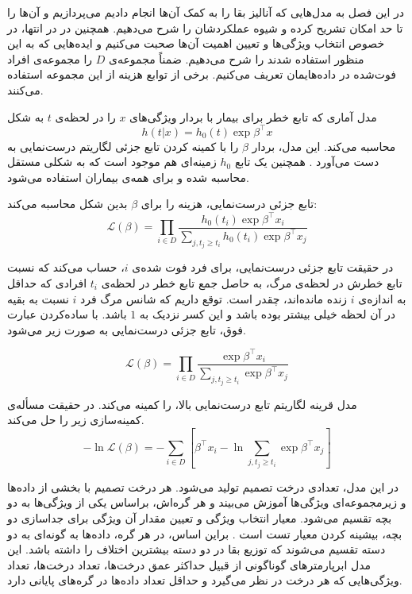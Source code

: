 
\newcommand{\norm}[1]{\left\lVert#1\right\rVert}


در این فصل به مدل‌هایی که آنالیز بقا را به کمک آن‌ها انجام دادیم می‌پردازیم و آن‌ها را تا حد امکان تشریح کرده و شیوه عملکردشان را شرح می‌دهیم. همچنین در در انتها، در خصوص انتخاب ویژگی‌ها و تعیین اهمیت آن‌ها صحبت می‌کنیم و ایده‌هایی که به این منظور استفاده شدند را شرح می‌دهیم. ضمناً مجموعه‌ی $D$ را مجموعه‌ی افراد فوت‌شده در داده‌هایمان تعریف می‌کنیم. برخی از توابع هزینه از این مجموعه استفاده می‌کنند.

مدل آماری  که تابع خطر برای بیمار با بردار ویژگی‌های $x$ را در لحظه‌ی $t$ به شکل 
$$h(t|x) = h_0(t) \exp{\beta^\intercal x}$$
محاسبه می‌کند. این مدل، بردار $\beta$ را با کمینه کردن تابع جزئی لگاریتم درست‌نمایی  به دست می‌آورد . همچنین یک تابع $h_0$ زمینه‌ای هم موجود است که به شکلی مستقل محاسبه شده و برای همه‌ی بیماران استفاده می‌شود.

تابع جزئی درست‌نمایی، هزینه را برای $\beta$ بدین شکل محاسبه می‌کند:
$$\mathcal{L}(\beta) = \prod_{i \in D} \frac{h_0(t_i) \exp{\beta^\intercal x_i}}{\sum_{j, t_j\geq t_i} h_0(t_i) \exp{\beta^\intercal x_j}}$$

در حقیقت تابع جزئی درست‌نمایی، برای فرد فوت شده‌ی $i$، حساب می‌کند که نسبت تابع خطرش در لحظه‌ی مرگ، به حاصل جمع تابع خطر در لحظه‌ی $t_i$ افرادی که حداقل به اندازه‌ی $i$ زنده مانده‌اند، چقدر است. توقع داریم که شانس مرگ فرد $i$ نسبت به بقیه در آن لحظه خیلی بیشتر بوده باشد و این کسر نزدیک به $1$ باشد. با ساده‌کردن عبارت فوق، تابع جزئی درست‌نمایی به صورت زیر می‌شود.

$$\mathcal{L}(\beta) = \prod_{i \in D} \frac{ \exp{\beta^\intercal x_i}}{\sum_{j, t_j\geq t_i} \exp{\beta^\intercal x_j}}$$

مدل  قرینه لگاریتم تابع درست‌نمایی بالا، را کمینه می‌کند. در حقیقت مسأله‌ی کمینه‌سازی زیر را حل می‌کند.
$$-\ln{\mathcal{L}(\beta)} = -\sum_{i \in D}\left[
\beta^\intercal x_i - \ln{\sum_{j, t_j\geq t_i} \exp{\beta^\intercal x_j}}
\right]$$

در این مدل، تعدادی درخت تصمیم تولید می‌شود. هر درخت تصمیم با بخشی از داده‌ها و زیرمجموعه‌ای ویژگی‌ها آموزش می‌بیند و هر گره‌اش، براساس یکی از ویژگی‌ها به دو بچه تقسیم می‌شود. معیار انتخاب ویژگی‌ و تعیین مقدار آن ویژگی برای جداسازی دو بچه، بیشینه کردن معیار تست   است . براین اساس، در هر گره، داده‌ها به گونه‌ای به دو دسته تقسیم می‌شوند که توزیع بقا در دو دسته بیشترین اختلاف را داشته باشد. این مدل ابرپارمتر‌های گوناگونی از قبیل حداکثر عمق درخت‌ها، تعداد درخت‌ها، تعداد ویژگی‌هایی که هر درخت در نظر می‌گیرد و حداقل تعداد داده‌ها در گره‌های پایانی دارد.

